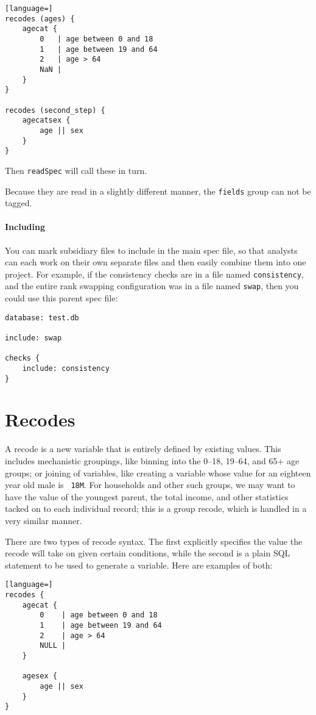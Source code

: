 \documentclass{article}
\begin{document}
\begin{lstlisting}[language=]
recodes (ages) {
    agecat {
        0   | age between 0 and 18
        1   | age between 19 and 64
        2   | age > 64
        NaN |
    }
}

recodes (second_step) {
    agecatsex {
        age || sex
    }
}
\end{lstlisting}

Then {\tt readSpec} will call these in turn.

Because they are read in a slightly different manner, the {\tt fields} group can not be tagged.


\paragraph{Including} You can mark subsidiary files to include in the main
spec file, so that analysts can each work on their own separate files and then
easily combine them into one project. For
example, if the consistency checks are in a file named {\tt consistency}, and
the entire rank swapping configuration was in a file named {\tt swap}, then you
could use this parent spec file:
\begin{verbatim}
database: test.db

include: swap

checks {
    include: consistency
}
\end{verbatim}

\section{Recodes}

A recode is a new variable that is entirely defined by existing values. This includes 
mechanistic groupings, like binning into the 0--18, 19--64, and 65+ age groups; or joining of
variables, like creating a variable whose value for an eighteen year old male is {\tt
18M}. For households and other such groups, we may want to have the value of the youngest
parent, the total income, and other statistics tacked on to each individual record; this
is a group recode, which is handled in a very similar manner.

There are two types of recode syntax. The first explicitly specifies the value the recode
will take on given certain conditions, while the second is a plain SQL statement to be
used to generate a variable. Here are examples of both:

\begin{lstlisting}[language=]
recodes {
    agecat {
        0    | age between 0 and 18
        1    | age between 19 and 64
        2    | age > 64
        NULL |
    }

    agesex {
        age || sex
    }
}
\end{lstlisting}
\end{document}
